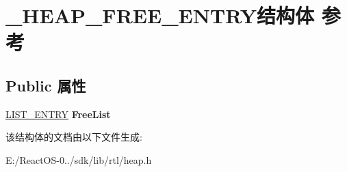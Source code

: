 \hypertarget{struct___h_e_a_p___f_r_e_e___e_n_t_r_y}{}\section{\+\_\+\+H\+E\+A\+P\+\_\+\+F\+R\+E\+E\+\_\+\+E\+N\+T\+R\+Y结构体 参考}
\label{struct___h_e_a_p___f_r_e_e___e_n_t_r_y}
\subsection*{Public 属性}
\begin{DoxyCompactItemize}
\item 
\mbox{\label{struct___h_e_a_p___f_r_e_e___e_n_t_r_y_a5e21afd15a4eda838c7a0c217e5268ed}} 
\hyperlink{struct___l_i_s_t___e_n_t_r_y}{L\+I\+S\+T\+\_\+\+E\+N\+T\+RY} {\bfseries Free\+List}
\end{DoxyCompactItemize}


该结构体的文档由以下文件生成\+:\begin{DoxyCompactItemize}
\item 
E\+:/\+React\+O\+S-\/0../sdk/lib/rtl/heap.\+h\end{DoxyCompactItemize}
